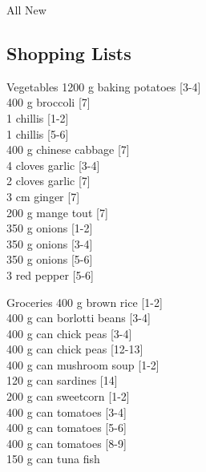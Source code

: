 \begin{menu}{All New}
    \subsection*{Shopping Lists}
      \begin{shoppinglist}{Vegetables}
      1200 g baking potatoes 
        {\scriptsize[3-4]}\\
      400 g broccoli 
        {\scriptsize[7]}\\
      1  chillis 
        {\scriptsize[1-2]}\\
      1  chillis 
        {\scriptsize[5-6]}\\
      400 g chinese cabbage 
        {\scriptsize[7]}\\
      4 cloves garlic 
        {\scriptsize[3-4]}\\
      2 cloves garlic 
        {\scriptsize[7]}\\
      3 cm ginger 
        {\scriptsize[7]}\\
      200 g mange tout 
        {\scriptsize[7]}\\
      350 g onions 
        {\scriptsize[1-2]}\\
      350 g onions 
        {\scriptsize[3-4]}\\
      350 g onions 
        {\scriptsize[5-6]}\\
      3  red pepper 
        {\scriptsize[5-6]}\\
      \end{shoppinglist}%
      \begin{shoppinglist}{Groceries}
      400 g brown rice 
        {\scriptsize[1-2]}\\
      400 g can borlotti beans 
        {\scriptsize[3-4]}\\
      400 g can chick peas 
        {\scriptsize[3-4]}\\
      400 g can chick peas 
        {\scriptsize[12-13]}\\
      400 g can mushroom soup 
        {\scriptsize[1-2]}\\
      120 g can sardines 
        {\scriptsize[14]}\\
      200 g can sweetcorn 
        {\scriptsize[1-2]}\\
      400 g can tomatoes 
        {\scriptsize[3-4]}\\
      400 g can tomatoes 
        {\scriptsize[5-6]}\\
      400 g can tomatoes 
        {\scriptsize[8-9]}\\
      150 g can tuna fish 

\end{shoppinglist}
\end{menu}
